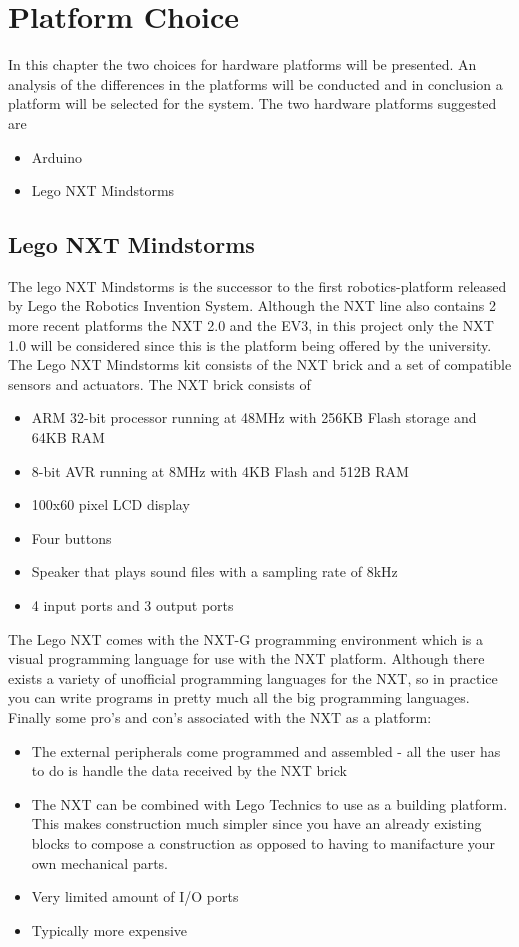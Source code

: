 \chapter{Platform Choice}
In this chapter the two choices for hardware platforms will be presented. An analysis of the differences in the platforms will be conducted and in conclusion a platform will be selected for the system. The two hardware platforms suggested are
\begin{itemize}
	\item Arduino
	\item Lego NXT Mindstorms
\end{itemize}

\section{Lego NXT Mindstorms}
The lego NXT Mindstorms is the successor to the first robotics-platform released by Lego the Robotics Invention System.
Although the NXT line also contains 2 more recent platforms the NXT 2.0 and the EV3, in this project only the NXT 1.0 will be considered
since this is the platform being offered by the university.\nl
The Lego NXT Mindstorms kit consists of the NXT brick and a set of compatible sensors and actuators.\nl
The NXT brick consists of
\begin{itemize}
  \item ARM 32-bit processor running at 48MHz with 256KB Flash storage and 64KB RAM
  \item 8-bit AVR running at 8MHz with 4KB Flash and 512B RAM
  \item 100x60 pixel LCD display
  \item Four buttons
  \item Speaker that plays sound files with a sampling rate of 8kHz
  \item 4 input ports and 3 output ports
\end{itemize}
The Lego NXT comes with the NXT-G programming environment which is a visual programming language for use with the NXT platform.
Although there exists a variety of unofficial programming languages for the NXT, so in practice you can write programs
in pretty much all the big programming languages.
Finally some pro's and con's associated with the NXT as a platform:
\begin{itemize}
  \item The external peripherals come programmed and assembled - all the user has to do is handle the data received by the NXT brick
  \item The NXT can be combined with Lego Technics to use as a building platform. This makes construction much simpler since you have
  an already existing blocks to compose a construction as opposed to having to manifacture your own mechanical parts.
  \item Very limited amount of I/O ports
  \item Typically more expensive
\end{itemize}
